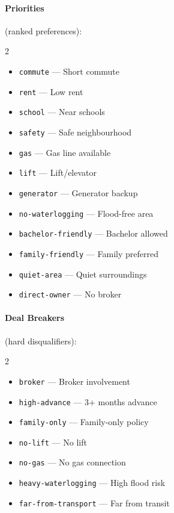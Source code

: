 \documentclass[12pt, a4paper, oneside]{report}
\begin{document}
\paragraph{Priorities} (ranked preferences):

\begin{multicols}{2}
\begin{itemize}[leftmargin=1em]
  \item \texttt{commute} --- Short commute
  \item \texttt{rent} --- Low rent
  \item \texttt{school} --- Near schools
  \item \texttt{safety} --- Safe neighbourhood
  \item \texttt{gas} --- Gas line available
  \item \texttt{lift} --- Lift/elevator
  \item \texttt{generator} --- Generator backup
  \item \texttt{no-waterlogging} --- Flood-free area
  \item \texttt{bachelor-friendly} --- Bachelor allowed
  \item \texttt{family-friendly} --- Family preferred
  \item \texttt{quiet-area} --- Quiet surroundings
  \item \texttt{direct-owner} --- No broker
\end{itemize}
\end{multicols}

\paragraph{Deal Breakers} (hard disqualifiers):

\begin{multicols}{2}
\begin{itemize}[leftmargin=1em]
  \item \texttt{broker} --- Broker involvement
  \item \texttt{high-advance} --- 3+ months advance
  \item \texttt{family-only} --- Family-only policy
  \item \texttt{no-lift} --- No lift
  \item \texttt{no-gas} --- No gas connection
  \item \texttt{heavy-waterlogging} --- High flood risk
  \item \texttt{far-from-transport} --- Far from transit
\end{itemize}
\end{multicols}
\end{document}
